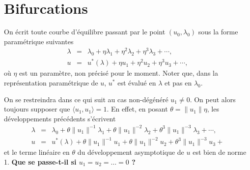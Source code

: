\documentclass{article}
\newcommand{\tmstrong}[1]{\textbf{#1}}
\newcommand{\nonconverted}[1]{\mbox{}}
\begin{document}
\section{Bifurcations}

On {\'e}crit toute courbe d'{\'e}quilibre passant par le point $(u_0,
\lambda_0)$ sous la forme param{\'e}trique suivantes
\begin{eqnarray}
  \lambda & = & \lambda_0 + \eta \lambda_1 + \eta^2 \lambda_2 + \eta^3
  \lambda_3 + \cdots,  \label{eq20211115075817}\\
  u & = & u^{\ast} (\lambda) + \eta u_1 + \eta^2 u_2 + \eta^3 u_3 + \cdots, 
  \label{eq20211115075835}
\end{eqnarray}
o{\`u} $\eta$ est un param{\`e}tre, non pr{\'e}cis{\'e} pour le moment. Noter
que, dans la repr{\'e}sentation param{\'e}trique de $u$, $u^{\ast}$ est
{\'e}valu{\'e} en $\lambda$ et pas en $\lambda_0$.

On se restreindra dans ce qui suit au cas non-d{\'e}g{\'e}n{\'e}r{\'e} $u_1
\neq 0$. On peut alors toujours supposer que $\langle u_1, u_1 \rangle = 1$.
En effet, en posant $\theta = \lVert u_1 \rVert \eta$, les d{\'e}veloppements
pr{\'e}c{\'e}dents s'{\'e}crivent
\begin{eqnarray}
  \lambda & = & \lambda_0 + \theta \lVert u_1 \rVert^{- 1} \lambda_1 + \theta
  \nonconverted{twosuperior} \lVert u_1 \rVert^{- 2} \lambda_2 + \theta^3
  \lVert u_1 \rVert^{- 3} \lambda_3 + \cdots, \\
  u & = & u^{\ast} (\lambda) + \theta \lVert u_1 \rVert^{- 1} u_1 + \theta
  \nonconverted{twosuperior} \lVert u_1 \rVert^{- 2} u_2 + \theta^3 \lVert u_1
  \rVert^{- 3} u_3 + 
\end{eqnarray}
et le terme lin{\'e}aire en $\theta$ du d{\'e}veloppement asymptotique de $u$
est bien de norme 1. {\tmstrong{Que se passe-t-il si $u_1 = u_2 = \ldots = 0$
?}}
\end{document}
